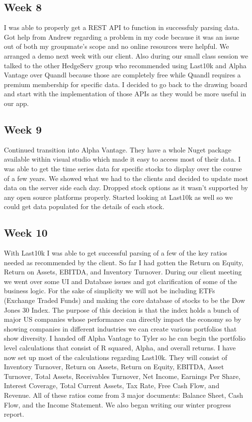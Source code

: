 \documentclass[onecolumn, draftclsnofoot,10pt, compsoc]{IEEEtran}
\begin{document}
    \subsection{Week 8}
    I was able to properly get a REST API to function in successfuly parsing data. Got help from Andrew regarding a problem in my code because it was an issue out of both my groupmate's scope and no online resources were helpful. We arranged a demo next week with our client. Also during our small class session we talked to the other HedgeServ group who recommended using Last10k and Alpha Vantage over Quandl because those are completely free while Quandl requires a premium membership for specific data. I decided to go back to the drawing board and start with the implementation of those APIs as they would be more useful in our app. 
    
    \subsection{Week 9} 
    Continued transition into Alpha Vantage. They have a whole Nuget package available within visual studio which made it easy to access most of their data. I was able to get the time series data for specific stocks to display over the course of a few years. We showed what we had to the clients and decided to update most data on the server side each day. Dropped stock options as it wasn't supported by any open source platforms properly. Started looking at Last10k as well so we could get data populated for the  details of each stock.
    
    \subsection{Week 10} 
    With Last10k I was able to get successful parsing of a few of the key ratios needed as recommended by the client. So far I had gotten the Return on Equity, Return on Assets, EBITDA, and Inventory Turnover. During our client meeting we went over some UI and Database issues and got clarification of some of the business logic. For the sake of simplicity we will not be including ETFs (Exchange Traded Funds) and making the core database of stocks to be the Dow Jones 30 Index. The purpose of this decision is that the index holds a bunch of major US companies whose performance can directly impact the economy so by showing companies in different industries we can create various portfolios that show diversity. I handed off Alpha Vantage to Tyler so he can begin the portfolio level calculations that consist of R squared, Alpha, and overall returns. I have now set up most of the calculations regarding Last10k. They will consist of  Inventory Turnover, Return on Assets, Return on Equity, EBITDA, Asset Turnover, Total Assets, Receivables Turnover, Net Income, Earnings Per Share, Interest Coverage, Total Current Assets, Tax Rate, Free Cash Flow, and Revenue. All of these ratios come from 3 major documents: Balance Sheet, Cash Flow, and the Income Statement. We also began writing our winter progress report. 
    
\end{document}
